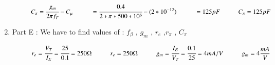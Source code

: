 \begin{enumerate}[label=\thesubsection.\arabic*.,ref=\thesubsection.\theenumi]
\begin{align}
\hspace{1cm}      C_{\pi} = \cfrac{g_{m}}{2\pi f_{T}}- C_{\mu}
              
              \vspace{0.5cm}
              
\hspace{1cm}              =\cfrac{0.4}{2*\pi*500*{10^6}}- (2*{10^{-12}})
              
              \vspace{0.5cm}
              
\hspace{1cm}              = 125 pF
              
              \vspace{0.5cm}
              
        
\hspace{1cm}        C_{\pi} = 125 pF 

\vspace{1cm}

\end{align}

\item
Part E : We have to find values of :
 $f_{\beta}$ , $g_{m}$ , $r_{e}$ ,$r_{\pi}$ , $C_{\pi}$
 
  \vspace{0.5cm}
  
 \solution

\begin{align}

\hspace{1cm}        r_{e} = \cfrac{V_{T}}{I_{E}}
              = \cfrac{25}{0.1}
              = 250 \ohm
              
              \vspace{0.5cm}
              
\hspace{1cm}        r_{e} = 250 \ohm
 
 \vspace{1cm}
 
\hspace{1cm}      g_{m} = \cfrac{I_{E}}{V_{T}}
        = \cfrac{0.1}{25}
        =  4 mA/V
        
        \vspace{0.5cm}
        
\hspace{1cm}        g_{m}=  4 \frac{mA}{V}
        
        \vspace{1cm}


\end{align}
\end{enumerate}
